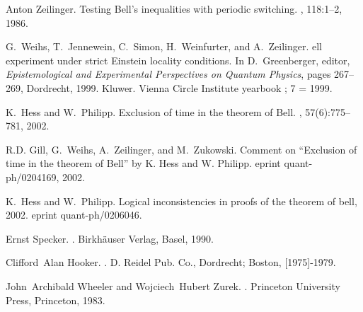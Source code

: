 \documentclass{epl}
\begin{document}
\begin{thebibliography}{10}
Anton Zeilinger.
\newblock Testing {B}ell's inequalities with periodic switching.
, 118:1--2, 1986.

G.~Weihs, T.~Jennewein, C.~Simon, H.~Weinfurter, and A.~Zeilinger.
ell experiment under strict {E}instein locality conditions.
\newblock In D.~Greenberger, editor, {\em Epistemological and Experimental
  Perspectives on Quantum Physics}, pages 267--269, Dordrecht, 1999. Kluwer.
\newblock Vienna Circle Institute yearbook ; 7 = 1999.

K.~Hess and W.~Philipp.
\newblock Exclusion of time in the theorem of {B}ell.
, 57(6):775--781, 2002.

R.D. Gill, G.~Weihs, A.~Zeilinger, and M.~Zukowski.
\newblock Comment on ``{E}xclusion of time in the theorem of {B}ell'' by {K}.
  {H}ess and {W}. {P}hilipp.
\newblock eprint quant-ph/0204169, 2002.

K.~Hess and W.~Philipp.
\newblock Logical inconsistencies in proofs of the theorem of bell, 2002.
\newblock eprint quant-ph/0206046.

Ernst Specker.
.
\newblock Birkh{\"{a}}user Verlag, Basel, 1990.

Clifford~Alan Hooker.
.
\newblock D. Reidel Pub. Co., Dordrecht; Boston, [1975]-1979.

John~Archibald Wheeler and Wojciech~Hubert Zurek.
.
\newblock Princeton University Press, Princeton, 1983.

\end{thebibliography}
\end{document}
